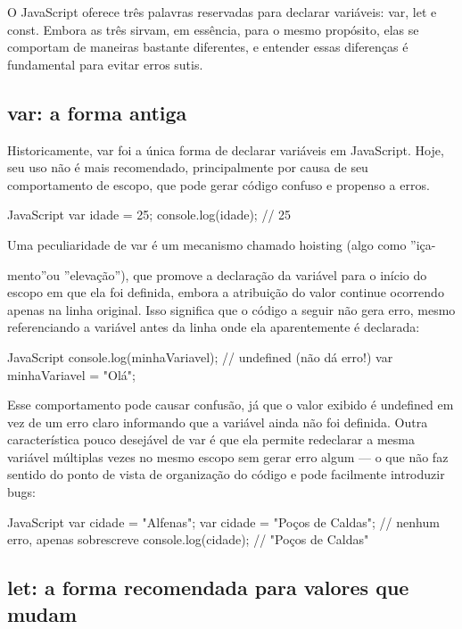 O JavaScript oferece três palavras reservadas para declarar variáveis: var, let e const. Embora as três sirvam, em essência, para o mesmo propósito, elas se comportam de maneiras bastante diferentes, e entender essas diferenças é fundamental para evitar erros sutis.

\subsection{var: a forma antiga}

Historicamente, var foi a única forma de declarar variáveis em JavaScript. Hoje, seu uso não é mais recomendado, principalmente por causa de seu comportamento de escopo, que pode gerar código confuso e propenso a erros.

\begin{codebox}{JavaScript}
var idade = 25;
console.log(idade); // 25

   Uma peculiaridade de var é um mecanismo chamado hoisting (algo como ”iça-
\end{codebox}

mento”ou ”elevação”), que promove a declaração da variável para o início do escopo em que ela foi definida, embora a atribuição do valor continue ocorrendo apenas na linha original. Isso significa que o código a seguir não gera erro, mesmo referenciando a variável antes da linha onde ela aparentemente é declarada:

\begin{codebox}{JavaScript}
console.log(minhaVariavel); // undefined (não dá erro!)
var minhaVariavel = "Olá";
\end{codebox}

Esse comportamento pode causar confusão, já que o valor exibido é undefined em vez de um erro claro informando que a variável ainda não foi definida. Outra característica pouco desejável de var é que ela permite redeclarar a mesma variável múltiplas vezes no mesmo escopo sem gerar erro algum — o que não faz sentido do ponto de vista de organização do código e pode facilmente introduzir bugs:

\begin{codebox}{JavaScript}
var cidade = "Alfenas";
var cidade = "Poços de Caldas"; // nenhum erro, apenas sobrescreve
console.log(cidade); // "Poços de Caldas"
\end{codebox}

\subsection{let: a forma recomendada para valores que mudam}

